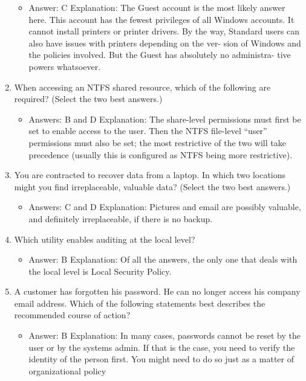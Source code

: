 \documentclass{article}
\begin{document}
\begin{enumerate}
    \begin{itemize}
        \item Answer: C
Explanation: The Guest account is the most likely answer here. This account has the
fewest privileges of all Windows accounts. It cannot install printers or printer drivers.
By the way, Standard users can also have issues with printers depending on the ver-
sion of Windows and the policies involved. But the Guest has absolutely no administra-
tive powers whatsoever.
    \end{itemize}
    \item When accessing an NTFS shared resource, which of the following
are required? (Select the two best answers.)
    \begin{itemize}
        \item Answers: B and D
Explanation: The share-level permissions must first be set to enable access to the
user. Then the NTFS file-level “user” permissions must also be set; the most restrictive
of the two will take precedence (usually this is configured as NTFS being more restrictive).
    \end{itemize}
    \item You are contracted to recover data from a laptop. In which two
locations might you find irreplaceable, valuable data? (Select the
two best answers.)
    \begin{itemize}
        \item Answers: C and D
Explanation: Pictures and email are possibly valuable, and definitely irreplaceable, if
there is no backup.
    \end{itemize}
    \item Which utility enables auditing at the local level?
    \begin{itemize}
        \item Answer: B
Explanation: Of all the answers, the only one that deals with the local level is Local
Security Policy.
    \end{itemize}
    \item A customer has forgotten his password. He can no longer access
his company email address. Which of the following statements
best describes the recommended course of action?
    \begin{itemize}
        \item Answer: B
Explanation: In many cases, passwords cannot be reset by the user or by the systems
admin. If that is the case, you need to verify the identity of the person first. You might
need to do so just as a matter of organizational policy

\end{itemize}
\end{enumerate}
\end{document}
